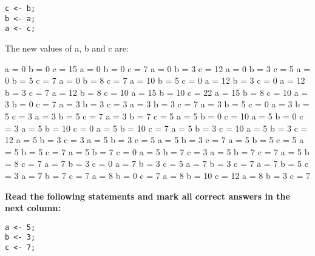 \documentclass[10pt]{exam}
\begin{document}
\begin{questions}
\begin{minipage}[t][][t]{0.18\textwidth}
\begin{lstlisting}
c <- b;
b <- a;
a <- c;
  \end{lstlisting}
\end{minipage}
  \hfill
\begin{minipage}[t][][t]{0.75\textwidth}
  The new values of a, b and c are:
  \begin{multicols*}{3}
\begin{checkboxes}
    \choice a = 0 b = 0 c = 15
    \choice a = 0 b = 0 c = 7
    \choice a = 0 b = 3 c = 12
    \choice a = 0 b = 3 c = 5
    \choice a = 0 b = 5 c = 7
    \choice a = 0 b = 8 c = 7
    \choice a = 10 b = 5 c = 0
    \choice a = 12 b = 3 c = 0
    \choice a = 12 b = 3 c = 7
    \choice a = 12 b = 8 c = 10
    \choice a = 15 b = 10 c = 22
    \choice a = 15 b = 8 c = 10
    \choice a = 3 b = 0 c = 7
    \choice a = 3 b = 3 c = 3
    \choice a = 3 b = 3 c = 7
    \choice a = 3 b = 5 c = 0
    \choice a = 3 b = 5 c = 3
    \choice a = 3 b = 5 c = 7
    \choice a = 3 b = 7 c = 5
    \choice a = 5 b = 0 c = 10
    \choice a = 5 b = 0 c = 3
    \choice a = 5 b = 10 c = 0
    \choice a = 5 b = 10 c = 7
    \choice a = 5 b = 3 c = 10
    \choice a = 5 b = 3 c = 12
    \choice a = 5 b = 3 c = 3
    \choice a = 5 b = 3 c = 5
    \choice a = 5 b = 3 c = 7
    \choice a = 5 b = 5 c = 5
    \choice a = 5 b = 5 c = 7
    \choice a = 5 b = 7 c = 0
    \choice a = 5 b = 7 c = 3
    \choice a = 5 b = 7 c = 7
    \choice a = 5 b = 8 c = 7
    \choice a = 7 b = 3 c = 0
    \choice a = 7 b = 3 c = 5
    \choice a = 7 b = 3 c = 7
    \choice a = 7 b = 5 c = 3
    \choice a = 7 b = 7 c = 7
    \choice a = 8 b = 0 c = 7
    \choice a = 8 b = 10 c = 12
    \choice a = 8 b = 3 c = 7
  \end{checkboxes}
\end{multicols*}
\end{minipage}

\vspace{1cm}  \begin{minipage}[t][][t]{0.18\textwidth}
\question \bf Read the following statements and mark all correct answers in the next column: \raggedright
  \begin{lstlisting}
a <- 5;
b <- 3;
c <- 7;


\end{lstlisting}
\end{minipage}
\end{questions}
\end{document}
